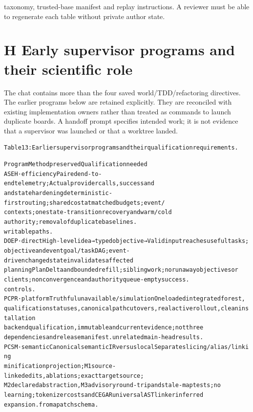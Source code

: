 \documentclass{article}
\begin{document}
taxonomy, trusted-base manifest and replay instructions. A reviewer must be able to regenerate each
table without private author state.

\section*{H Early supervisor programs and their scientific role}
The chat contains more than the four saved world/TDD/refactoring directives. The earlier programs
below are retained explicitly. They are reconciled with existing implementation owners rather than
treated as commands to launch duplicate boards. A handoff prompt specifies intended work; it is not
evidence that a supervisor was launched or that a worktree landed.

\begingroup\fontsize{7}{8.4}\selectfont
\begin{alltt}
Table 13: Earlier supervisor programs and their qualification requirements.
\end{alltt}\endgroup

\begingroup\fontsize{7}{8.4}\selectfont
\begin{alltt}
Program                  Method preserved                           Qualification needed
ASEH · efficiency        Paired end-to-end telemetry;               Actual provider calls, success and
and state hardening      deterministic-first routing; shared        cost at matched budgets; event/
                         contexts; one state-transition             recovery and warm/cold
                         authority; removal of duplicate            baselines.
                         writable paths.
DOEP · direct            High-level idea → typed objective →        Valid input reaches useful tasks;
objective and event      goal/task DAG; event-driven                changed state invalidates affected
planning                 PlanDelta and bounded refill; sibling      work; no runaway objectives or
                         clients; nonconvergence and authority      queue-empty success.
                         controls.
PCPR · platform          Truthful unavailable/simulation            One loaded integrated forest,
qualification            statuses, canonical path cutovers, real    active rollout, clean installation
                         backend qualification, immutable           and current evidence; not three
                         dependencies and release manifest.         unrelated main-head results.
PCSM · semantic          Canonical semantic IR versus local         Separate slicing/alias/linking
minification             projection; M1 source-linked edits,        ablations; exact target source;
                         M2 declared abstraction, M3 advisory       round-trip and stale-map tests; no
                         learning; tokenizer costs and CEGAR        universal AST linker inferred
                         expansion.                                 from a patch schema.
\end{alltt}\endgroup
\end{document}
